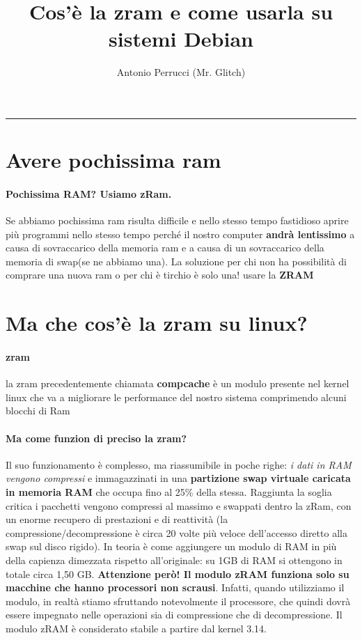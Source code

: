 \documentclass{article}
\title{Cos'è la zram e come usarla su sistemi Debian}
\author{Antonio Perrucci (Mr. Glitch)}
\begin{document}
	\maketitle
	\hrule
	\newpage

	\section{Avere pochissima ram}
		\paragraph{Pochissima RAM? Usiamo zRam.} Se abbiamo pochissima  ram risulta  
		difficile e nello stesso tempo fastidioso aprire più programmi nello stesso tempo
		perché il nostro computer \textbf{andrà lentissimo} a causa  di sovraccarico della memoria
		ram e a causa di un sovraccarico della memoria di swap(se ne abbiamo una). 
		La soluzione per chi non ha possibilità di comprare una nuova ram o per chi è tirchio
		è solo una! usare la \textbf{ZRAM}  
	
	\section{Ma che cos'è  la zram su linux?}
		\paragraph{zram} la zram precedentemente chiamata \textbf{compcache} è un modulo presente
		nel kernel linux che va a migliorare le performance del nostro sistema comprimendo alcuni 
		blocchi di Ram

		\paragraph{Ma come funzion di preciso la  zram?}
		 Il suo funzionamento è complesso, ma riassumibile in poche righe:  \textit{i dati in RAM vengono compressi} e
		immagazzinati in una \textbf{partizione swap virtuale caricata in memoria RAM} che occupa fino al 25\% della
		stessa. Raggiunta la soglia critica i pacchetti vengono compressi al massimo e swappati dentro la zRam, con un 		enorme recupero di prestazioni e di reattività (la compressione/decompressione è circa 20 volte più veloce
		dell’accesso diretto alla swap sul disco rigido). 
		In teoria è come aggiungere un modulo di RAM in più della capienza dimezzata rispetto all’originale: su 1GB di
		RAM si ottengono in totale circa 1,50 GB. \textbf{Attenzione però! Il modulo
		zRAM funziona solo su macchine che hanno processori non scrausi}. Infatti, quando utilizziamo il modulo,
		in realtà stiamo sfruttando notevolmente il processore, che quindi dovrà essere impegnato nelle operazioni sia di
		compressione che di decompressione. Il modulo zRAM è considerato stabile a partire dal kernel 3.14. 
\end{document}
